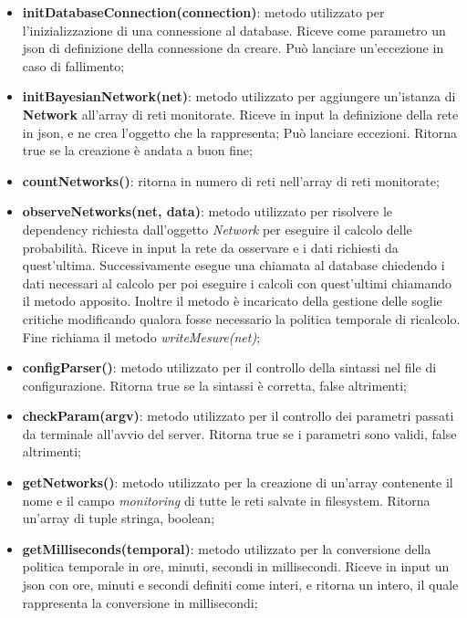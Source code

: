 \begin{itemize}
	 \item \textbf{initDatabaseConnection(connection)}: metodo utilizzato per l'inizializzazione di una 
	 connessione al database. Riceve come parametro un json di definizione della connessione da creare. 
	 Può lanciare un'eccezione in caso di fallimento;

	 \item \textbf{initBayesianNetwork(net)}: metodo utilizzato per aggiungere un'istanza di \textbf{Network}
	 all'array di reti monitorate. Riceve in input la definizione della rete in json, e ne crea l'oggetto che la rappresenta; Può lanciare eccezioni. Ritorna true se la creazione è andata a buon fine; 

	\item \textbf{countNetworks()}: ritorna in numero di reti nell'array di reti monitorate; 

	\item \textbf{observeNetworks(net, data)}: metodo utilizzato per risolvere le dependency richiesta
	dall'oggetto \textit{Network} per eseguire il calcolo delle probabilità. Riceve in input la rete da osservare
	e i dati richiesti da quest'ultima. Successivamente esegue una chiamata al database chiedendo i dati 
	necessari al calcolo per poi eseguire i calcoli con quest'ultimi chiamando il metodo apposito. Inoltre 
	il metodo è incaricato della gestione delle soglie critiche modificando qualora fosse necessario 
	la politica temporale di ricalcolo. Fine richiama il metodo \textit{writeMesure(net)}; 

	\item \textbf{configParser()}: metodo utilizzato per il controllo  della sintassi nel file di configurazione.
	Ritorna true se la sintassi è corretta, false altrimenti; 

	\item \textbf{checkParam(argv)}: metodo utilizzato per il controllo dei parametri passati da terminale
	all'avvio del server. Ritorna true se i parametri sono validi, false altrimenti; 

	\item \textbf{getNetworks()}: metodo utilizzato per la creazione di un'array contenente il nome e 
	il campo \textit{monitoring} di tutte le reti salvate in filesystem. Ritorna un'array di tuple stringa, boolean; 

	\item \textbf{getMilliseconds(temporal)}: metodo utilizzato per la conversione della politica temporale in 
	ore, minuti, secondi in millisecondi. Riceve in input un json con ore, minuti e secondi definiti come interi, 
	e ritorna un intero, il quale rappresenta la conversione in millisecondi; 


\end{itemize}
